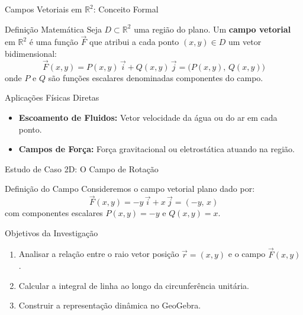 \documentclass[aspectratio=169, 13pt]{beamer}
\begin{document}
	\begin{frame}{Campos Vetoriais em $\mathbb{R}^2$: Conceito Formal}
		\begin{block}{Definição Matemática}
			Seja $D \subset \mathbb{R}^2$ uma região do plano. Um \textbf{campo vetorial} em $\mathbb{R}^2$ é uma função $\vec{F}$ que atribui a cada ponto $(x,y) \in D$ um vetor bidimensional:
			$$\vec{F}(x,y) = P(x,y)\,\vec{i} + Q(x,y)\,\vec{j} = \big(P(x,y),\, Q(x,y)\big)$$
			onde $P$ e $Q$ são funções escalares denominadas componentes do campo.
		\end{block}
		
		\vspace{0.2cm}
		\begin{exampleblock}{Aplicações Físicas Diretas}
			\begin{itemize}
				\item \textbf{Escoamento de Fluidos:} Vetor velocidade da água ou do ar em cada ponto.
				\item \textbf{Campos de Força:} Força gravitacional ou eletrostática atuando na região.
			\end{itemize}
		\end{exampleblock}
	\end{frame}
	
	\begin{frame}{Estudo de Caso 2D: O Campo de Rotação}
		\begin{block}{Definição do Campo}
			Consideremos o campo vetorial plano dado por:
			$$\vec{F}(x,y) = -y\,\vec{i} + x\,\vec{j} = (-y,\, x)$$
			com componentes escalares $P(x,y) = -y$ e $Q(x,y) = x$.
		\end{block}
		
		\vspace{0.3cm}
		\begin{block}{Objetivos da Investigação}
			\begin{enumerate}
				\item Analisar a relação entre o raio vetor posição $\vec{r} = (x,y)$ e o campo $\vec{F}(x,y)$.
				\item Calcular a integral de linha ao longo da circunferência unitária.
				\item Construir a representação dinâmica no GeoGebra.
			\end{enumerate}
		\end{block}
	\end{frame}
	
\end{document}
